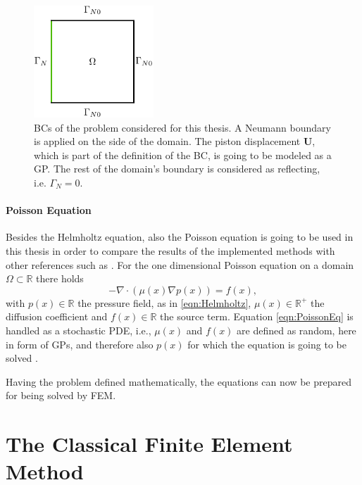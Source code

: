 \documentclass[%
  a4paper,oneside,%
  11pt,%
  smallchapters,
  style=printdev,
  extramargin,
  green,%
  rgb, <cmyk>
  ]{tubsbook}
\begin{document}
\begin{figure}[!ht]
\begin{center}
\includegraphics[width=0.4\textwidth]{pics/BCsThesis1}
\caption[BCs for the 2D Helmholtz equation example]{BCs of the problem considered for this thesis. A Neumann boundary is applied on the side of the domain. The piston displacement $\bm{U}$, which is part of the definition of the BC, is going to be modeled as a GP. The rest of the domain's boundary is considered as reflecting, i.e. $\Gamma_N = 0$.}
\label{fig:BCTh}
\end{center}
\end{figure}


\paragraph{Poisson Equation}
Besides the Helmholtz equation, also the Poisson equation is going to be used in this thesis in order to compare the results of the implemented methods with other references such as \cite{girolami2021}. For the one dimensional Poisson equation on a domain $\Omega \subset \mathbb{R} $ there holds
\begin{equation}
-\nabla \cdot (\mu(x) \nabla p(x)) = f(x),
\label{eqn:PoissonEq}
\end{equation}
with $p(x)\in \mathbb{R}$ the pressure field, as in \eqref{eqn:Helmholtz}, $\mu(x) \in \mathbb{R}^+$ the diffusion coefficient and $f(x) \in \mathbb{R}$ the source term.
Equation \eqref{eqn:PoissonEq} is handled as a stochastic PDE, i.e., $\mu(x)$ and $f(x)$ are defined as random, here in form of GPs, and therefore also $p(x)$ for which the equation is going to be solved \cite[p. 4]{girolami2021}. 


Having the problem defined mathematically, the equations can now be prepared for being solved by FEM.




\section{The Classical Finite Element Method}
\end{document}
